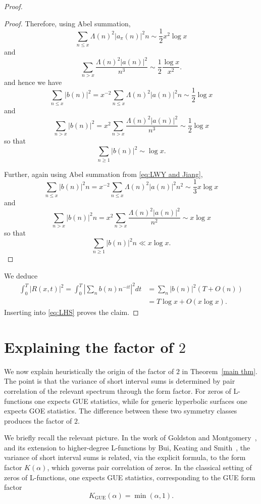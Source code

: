 \documentclass[12pt]{amsart}
\begin{document}
\begin{proof}
\begin{proof}
Therefore, using Abel summation, 
\[
\sum_{n \leq x} \Lambda(n)^2 |a_\pi(n)|^2 n \sim \frac 12x^2\log x   
\]
and 
\[
 \sum_{n>x} \frac{\Lambda(n)^2 |a(n)|^2}{n^3} \sim \frac 12 \frac{\log x}{ x^2}.
\]
and hence we have
\[
\sum_{n\leq x} |b(n)|^2 = x^{-2}\sum_{n\leq x} \Lambda(n)^2 |a(n)|^2 n \sim \frac 12  \log x 
\]
and
\[
\sum_{n>x} |b(n)|^2  = x^2 \sum_{n>x} \frac{\Lambda(n)^2 |a(n)|^2}{n^3} \sim \frac 12 \log x
\]
so that
\[
\sum_{n\geq 1} |b(n)|^2 \sim  \log x . 
\]

Further, again using Abel summation from \eqref{eq:LWY and Jiang}, 
\[
\sum_{n\leq x} |b(n)|^2 n = x^{-2}\sum_{n\leq x} \Lambda(n)^2 |a(n)|^2 n^2 \sim \frac 13 x  \log x
\]
and 
\[
\sum_{n>  x} |b(n)|^2 n =x^2 \sum_{n>x} \frac{\Lambda(n)^2 |a(n)|^2}{n^2} \sim  x\log x
\]
so that 
\[
\sum_{n\geq 1} |b(n)|^2 n \ll x \log x .
\]
\end{proof}

We deduce
\[
\begin{split}
 \int_0^T |R(x,t)|^2=  \int_0^T \left|\sum_{n} b(n)n^{-i t} \right|^2 dt &=   \sum_n |b(n)|^2 (T+O(n))
\\
&=   T\log x + O\left(  x\log x\right) .
\end{split}
\]
Inserting into \eqref{eq:LHS} proves the claim. 
 \end{proof}


\section{Explaining the factor of $2$}\label{sec:GOE}

 

We now explain heuristically the origin of the factor of $2$ in
Theorem~\ref{main thm}. The point is that the variance of short interval sums 
 is determined by pair correlation of the relevant spectrum through the form factor.
 For zeros of L-functions one expects GUE statistics,
while for generic hyperbolic surfaces one expects GOE statistics.
The difference between these two symmetry classes produces the
factor of $2$.

We briefly recall the relevant picture. In the work of Goldston and
Montgomery~\cite{GM}, and its extension to higher-degree
L-functions by Bui, Keating and Smith~\cite{BKS}, the variance of
short interval sums is related, via the explicit formula, to the form
factor $K(\alpha)$, 
which governs pair correlation of zeros. In the classical setting of
zeros of L-functions, one expects GUE statistics, corresponding to
the GUE form factor
\[
K_{\mathrm{GUE}}(\alpha)=\min(\alpha,1).
\]
\end{document}
